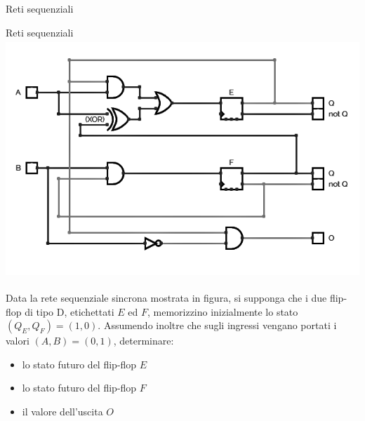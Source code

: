 \documentclass[11pt]{article}
\begin{document}
\begin{quiz}{Reti sequenziali}
\begin{cloze}[points=1,shuffle=false]{Reti sequenziali}
    \includegraphics[height=9cm]{figures/seq_3.png}
    
    Data la rete sequenziale sincrona mostrata in figura, si supponga che i due flip-flop di tipo D,
    etichettati $E$ ed $F$, memorizzino inizialmente lo stato $(Q_E,Q_F) = (1,0)$.
    Assumendo inoltre che sugli ingressi vengano portati i valori $(A,B)=(0,1)$,
    determinare:
    
    \begin{itemize}
    \item lo stato futuro del flip-flop $E$ 
    \item lo stato futuro del flip-flop $F$ 
    \item il valore dell'uscita $O$ 
    \end{itemize}
\end{cloze}


\end{quiz}
\end{document}
